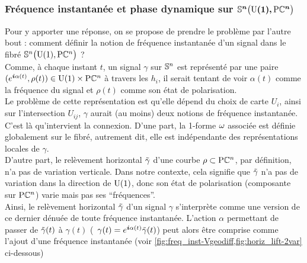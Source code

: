 \subsubsection{Fréquence instantanée et phase dynamique sur $\bf{\VFP}$}


Pour y apporter une réponse, on se propose de prendre le problème par l'autre bout : comment définir la notion de fréquence instantanée d'un signal dans le fibré $\VFP$ ?
\\
 
Comme, à chaque instant $t$, un signal $\gamma$ sur $\S{n}$ est représenté par une paire $(e^{\i \alpha(t)}, \rho(t))\in\U{1}\times\PC{n}$ à travers les $h_i$,  il serait tentant de voir $\alpha(t)$ comme la fréquence du signal et $\rho(t)$ comme son état de polarisation.
\\
Le problème de cette représentation est qu'elle dépend du choix de carte $U_i$, ainsi sur l'intersection $U_{ij}$, $\gamma$ aurait (au moins) deux notions de fréquence instantanée.
\\

C'est là qu'intervient la connexion. D'une part, la 1-forme $\conn$ associée est définie globalement sur le fibré, autrement dit, elle est indépendante des représentations locales de $\gamma$.
\\
D'autre part, le relèvement horizontal $\Tilde{\gamma}$ d'une courbe $\rho\subset\PC{n}$, par définition, n'a pas de variation verticale. Dans notre contexte, cela signifie que $\Tilde{\gamma}$ n'a pas de variation dans la direction de $\U{1}$, donc son état de polarisation (composante sur $\PC{n}$) varie mais pas ses ``fréquences''.
\\
Ainsi, le relèvement horizontal $\Tilde{\gamma}$ d'un signal $\gamma$ s'interprète comme une version de ce dernier dénuée de toute fréquence instantanée.
L'action $\alpha$ permettant de passer de $\Tilde{\gamma}(t)$ à $\gamma(t)$ (\ie~$\gamma(t) = e^{\i \alpha(t)} \Tilde{\gamma}(t)$) peut alors être comprise comme l'ajout d'une fréquence instantanée (voir \cref{fig:freq_inst-Vgeodiff,fig:horiz_lift-2var} ci-dessous)	
\\

